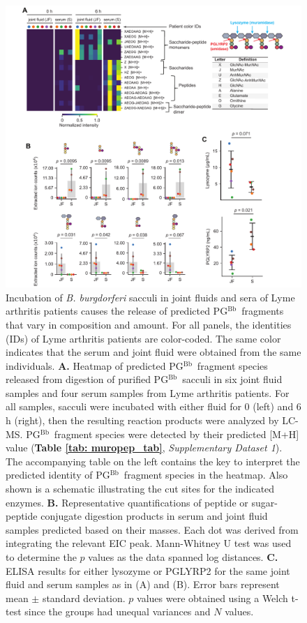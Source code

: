 \documentclass[twoside, watermark]{zHenriquesLab-StyleBioRxiv}
\newcommand{\pgbb}{PG$^\text{Bb}$}
\begin{document}
\begin{figure}
    \centering
    \includegraphics[width=\textwidth]{Figures/Figure_6_PG_Processing_in_Body_Fluids.pdf}
    \caption{Incubation of \textit{B. burgdorferi} sacculi in joint fluids and sera of Lyme arthritis patients causes the release of predicted \pgbb~fragments that vary in composition and amount. For all panels, the identities (IDs) of Lyme arthritis patients are color-coded. The same color indicates that the serum and joint fluid were obtained from the same individuals. \textbf{A.} Heatmap of predicted \pgbb~fragment species released from digestion of purified \pgbb~sacculi in six joint fluid samples and four serum samples from Lyme arthritis patients. For all samples, sacculi were incubated with either fluid for 0 (left) and 6 h (right), then the resulting reaction products were analyzed by LC-MS. \pgbb~fragment species were detected by their predicted [M+H] value (\textbf{Table \ref{tab: muropep_tab}}, \textit{Supplementary Dataset 1}). The accompanying table on the left contains the key to interpret the predicted identity of \pgbb~fragment species in the heatmap. Also shown is a schematic illustrating the cut sites for the indicated enzymes. \textbf{B.} Representative quantifications of peptide or sugar-peptide conjugate digestion products in serum and joint fluid samples predicted based on their masses. Each dot was derived from integrating the relevant EIC peak. Mann-Whitney U test was used to determine the $p$ values as the data spanned log distances.  \textbf{C.} ELISA results for either lysozyme or PGLYRP2 for the same joint fluid and serum samples as in (A) and (B). Error bars represent mean $\pm$ standard deviation. $p$ values were obtained using a Welch t-test since the groups had unequal variances and $N$ values.}
    \label{fig: fig6}
\end{figure}
\end{document}

